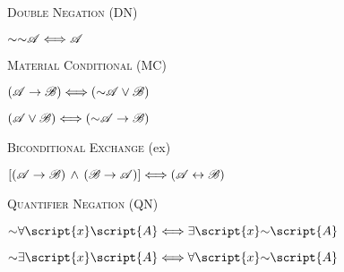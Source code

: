 {\begin{multicols}{2}
\noindent\textsc{Double Negation} (DN)
\begin{earg}
\item[] $\mathord{\sim}\mathord{\sim}\mathscr{A} \Longleftrightarrow \mathscr{A}$
\end{earg}

\noindent\textsc{Material Conditional} (MC)
\begin{earg}
\item[] $(\mathscr{A}\rightarrow\mathscr{B}) \Longleftrightarrow (\mathord{\sim}\mathscr{A}\lor\mathscr{B})$\\
\item[] $(\mathscr{A}\lor\mathscr{B}) \Longleftrightarrow (\mathord{\sim}\mathscr{A}\rightarrow\mathscr{B})$
\end{earg}

\noindent\textsc{Biconditional Exchange} ({\eiff}{ex})\\
\begin{earg}
\item[] $[(\mathscr{A}\rightarrow\mathscr{B})\,\land\,(\mathscr{B}\rightarrow\mathscr{A})] \Longleftrightarrow (\mathscr{A}\leftrightarrow\mathscr{B})$
\end{earg}

\noindent\textsc{Quantifier Negation} (QN)\\
\begin{earg}
\item[] $\enot\forall\script{x}\script{A} \Longleftrightarrow \exists\script{x}\enot\script{A}$\\
\item[] $\enot\exists\script{x}\script{A} \Longleftrightarrow \forall\script{x}\enot\script{A}$
\end{earg}

\end{multicols}
}{}
